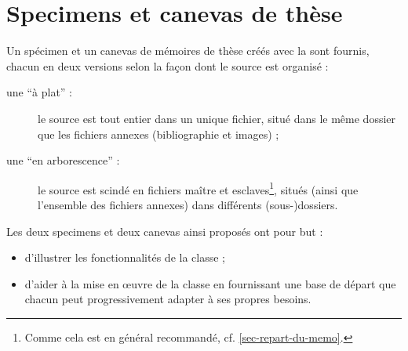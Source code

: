 \chapter{Specimens et canevas de thèse}\label{cha-specimen-canevas}%

Un spécimen et un canevas de mémoires de thèse créés avec la \yatcl sont
fournis, chacun en deux versions selon la façon dont le source  est
organisé :
\begin{description}
\item[une \enquote{à plat} :] le source est tout entier dans un unique fichier,
  situé dans le même dossier que les fichiers annexes (bibliographie et
  images) ;
\item[une \enquote{en arborescence} :] le source est scindé en fichiers maître
  et esclaves\footnote{Comme cela est en général recommandé,
    cf. \vref{sec-repart-du-memo}.}, situés (ainsi que l'ensemble des fichiers
  annexes) dans différents (sous-)dossiers.
\end{description}
Les deux specimens et deux canevas ainsi proposés ont pour but :
\begin{itemize}
\item d'illustrer les fonctionnalités de la classe ;
\item d'aider à la mise en œuvre de la classe en fournissant une base de départ
  que chacun peut progressivement adapter à ses propres
  besoins.
\end{itemize}

